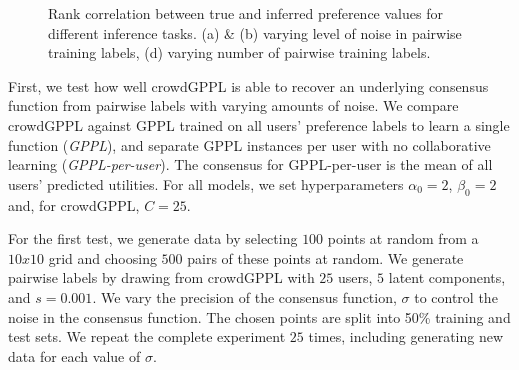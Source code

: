\begin{figure}
\caption{Rank correlation between true and inferred preference values for different inference tasks.  (a) \& (b) varying level of noise in pairwise training labels, (d) varying number of pairwise training labels. 
}
\end{figure}
First, we test how well crowdGPPL is able to recover an underlying consensus function
from pairwise labels with varying amounts of noise.
We compare crowdGPPL against GPPL trained on all users' preference labels to learn a single  function (\emph{GPPL}), %
and separate GPPL instances per user with no collaborative
learning (\emph{GPPL-per-user}). The consensus for GPPL-per-user is the mean of all users' predicted utilities. For all models, we set hyperparameters
$\alpha_0 = 2$, $\beta_0 = 2$ and, for crowdGPPL, $C=25$.

For the first test,
we generate data by selecting $100$ points at random
from a $10x10$ grid and choosing $500$ pairs of these points at random. 
We generate pairwise labels by drawing from crowdGPPL
with $25$ users, $5$ latent components, and 
$s=0.001$.
We vary the precision of the consensus function, $\sigma$ to control the noise in 
the consensus function. 
The chosen points are split into 50\% training and test sets.
We repeat the complete experiment $25$ times, including generating new data 
for each value of $\sigma$.

